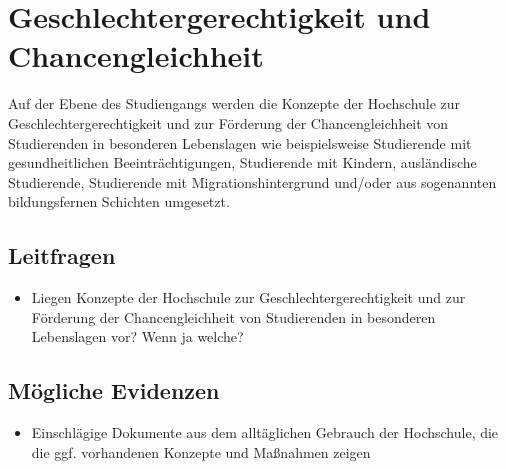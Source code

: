 %



\chapter{Geschlechtergerechtigkeit und Chancengleichheit}\label{Geschlechtergerechtigkeit und Chancengleichheit}


Auf der Ebene des Studiengangs werden die Konzepte der Hochschule zur
Geschlechtergerechtigkeit und zur Förderung der Chancengleichheit von
Studierenden in besonderen Lebenslagen wie beispielsweise Studierende
mit gesundheitlichen Beeinträchtigungen, Studierende mit Kindern,
ausländische Studierende, Studierende mit Migrationshintergrund und/oder
aus sogenannten bildungsfernen Schichten umgesetzt.

\section{Leitfragen}\label{leitfragen}

\begin{itemize}
\tightlist
\item
  Liegen Konzepte der Hochschule zur Geschlechtergerechtigkeit und zur
  Förderung der Chancengleichheit von Studierenden in besonderen
  Lebenslagen vor? Wenn ja welche?
\end{itemize}

\section{Mögliche Evidenzen}\label{muxf6gliche-evidenzen}

\begin{itemize}
\tightlist
\item
  Einschlägige Dokumente aus dem alltäglichen Gebrauch der Hochschule,
  die die ggf. vorhandenen Konzepte und Maßnahmen zeigen
\end{itemize}

%

